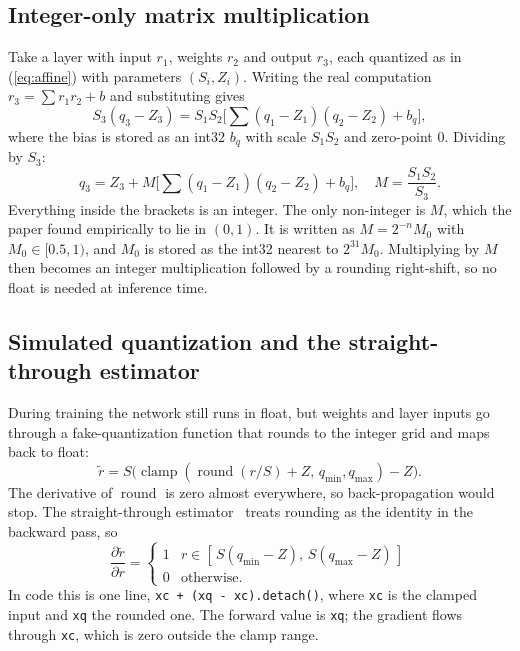 \documentclass[conference]{IEEEtran}
\begin{document}
\subsection{Integer-only matrix multiplication}
Take a layer with input $r_1$, weights $r_2$ and output $r_3$, each quantized as in (\ref{eq:affine}) with parameters $(S_i,Z_i)$. Writing the real computation $r_3=\sum r_1 r_2 + b$ and substituting gives
\begin{equation}
S_3(q_3-Z_3)=S_1S_2\Big[\sum (q_1-Z_1)(q_2-Z_2)+b_q\Big],
\end{equation}
where the bias is stored as an int32 $b_q$ with scale $S_1S_2$ and zero-point $0$. Dividing by $S_3$:
\begin{equation}
q_3 = Z_3 + M\Big[\sum (q_1-Z_1)(q_2-Z_2)+b_q\Big],\quad M=\frac{S_1S_2}{S_3}.
\label{eq:int}
\end{equation}
Everything inside the brackets is an integer. The only non-integer is $M$, which the paper found empirically to lie in $(0,1)$. It is written as $M=2^{-n}M_0$ with $M_0\in[0.5,1)$, and $M_0$ is stored as the int32 nearest to $2^{31}M_0$. Multiplying by $M$ then becomes an integer multiplication followed by a rounding right-shift, so no float is needed at inference time.

\subsection{Simulated quantization and the straight-through estimator}
During training the network still runs in float, but weights and layer inputs go through a fake-quantization function that rounds to the integer grid and maps back to float:
\begin{equation}
\tilde r = S\big(\operatorname{clamp}(\operatorname{round}(r/S)+Z,\,q_{\min},q_{\max})-Z\big).
\end{equation}
The derivative of $\operatorname{round}$ is zero almost everywhere, so back-propagation would stop. The straight-through estimator~\cite{bengio2013} treats rounding as the identity in the backward pass, so
\begin{equation}
\frac{\partial\tilde r}{\partial r}=\begin{cases}1 & r\in[\,S(q_{\min}-Z),\,S(q_{\max}-Z)\,]\\ 0 & \text{otherwise.}\end{cases}
\end{equation}
In code this is one line, \texttt{xc + (xq - xc).detach()}, where \texttt{xc} is the clamped input and \texttt{xq} the rounded one. The forward value is \texttt{xq}; the gradient flows through \texttt{xc}, which is zero outside the clamp range.
\end{document}
